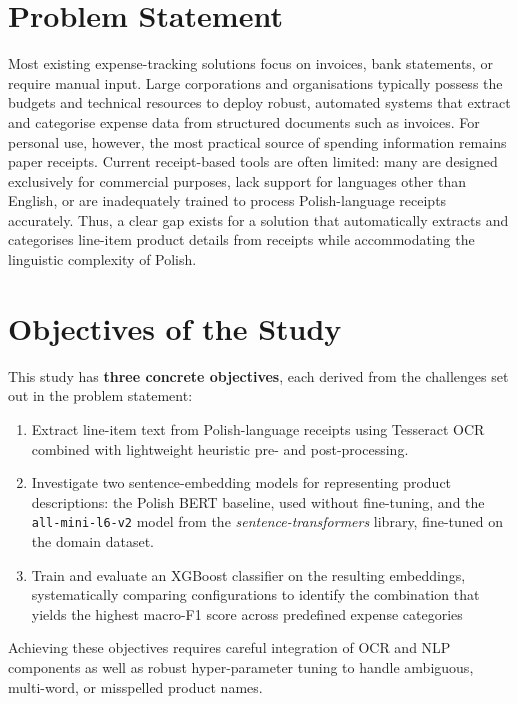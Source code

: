 \documentclass{SGGW-thesis-EN}
\begin{document}
\section{Problem Statement}
Most existing expense-tracking solutions focus on invoices, bank statements, or require manual input.
Large corporations and organisations typically possess the budgets and technical resources to deploy robust,
automated systems that extract and categorise expense data from structured documents such as invoices.
For personal use, however, the most practical source of spending information remains paper receipts.
Current receipt-based tools are often limited: many are designed exclusively for commercial purposes,
lack support for languages other than English,
or are inadequately trained to process Polish-language receipts accurately.
Thus, a clear gap exists for a solution that automatically extracts and categorises line-item product details
from receipts while accommodating the linguistic complexity of Polish.


\section{Objectives of the Study}

This study has \textbf{three concrete objectives}, each derived from the challenges set out in the problem statement:

\begin{enumerate}
  \item Extract line-item text from Polish-language receipts using Tesseract OCR combined with
        lightweight heuristic pre- and post-processing.

  \item Investigate two sentence-embedding models for representing product descriptions:
        the Polish BERT baseline, used without fine-tuning, and the \texttt{all-mini-l6-v2} model from
        the \emph{sentence-transformers} library, fine-tuned on the domain dataset.

  \item Train and evaluate an XGBoost classifier on the resulting embeddings, systematically
        comparing configurations to identify the combination that yields the highest macro-F1
        score across predefined expense categories
\end{enumerate}

Achieving these objectives requires careful integration of OCR and NLP components as well as robust
hyper-parameter tuning to handle ambiguous, multi-word, or misspelled product names.
\end{document}
